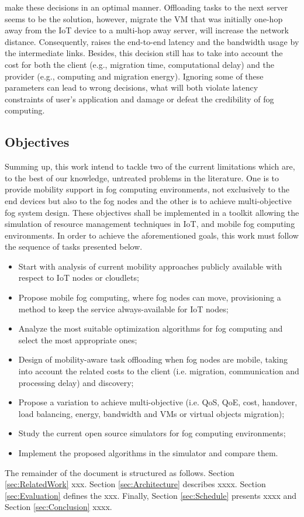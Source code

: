 make these decisions in an optimal manner. Offloading tasks to the next server
seems to be the solution, however, migrate the VM that was initially one-hop
away from the IoT device to a multi-hop away server, will increase the network
distance. Consequently, raises the end-to-end latency and the bandwidth usage by
the intermediate links. Besides, this decision still has to take into account
the cost for both the client (e.g., migration time, computational delay) and the
provider (e.g., computing and migration energy). Ignoring some of these
parameters can lead to wrong decisions, what will both violate latency
constraints of user's application and damage or defeat the credibility of fog
computing.
\subsection{Objectives}\label{subsec:Objectives}
\noindent\tab Summing up, this work intend to tackle two of the current
limitations which are, to the best of our knowledge, untreated problems in the
literature. One is to provide mobility support in fog computing environments,
not exclusively to the end devices but also to the fog nodes and the other is to
achieve multi-objective fog system design. These objectives shall be implemented
in a toolkit allowing the simulation of resource management techniques in IoT,
and mobile fog computing environments. In order to achieve the aforementioned
goals, this work must follow the sequence of tasks presented below.

\begin{itemize}
	\item Start with analysis of current mobility approaches publicly available
	with respect to IoT nodes or cloudlets;
	\item Propose mobile fog computing, where fog nodes can move, provisioning a
	method to keep the service always-available for IoT nodes;
	\item Analyze the most suitable optimization algorithms for fog computing
	and select the most appropriate ones;
	\item Design of mobility-aware task offloading when fog nodes are mobile,
	taking into account the related costs to the client (i.e. migration,
	communication and processing delay) and discovery;
	\item Propose a variation to achieve multi-objective (i.e. QoS, QoE, cost,
	handover, load balancing, energy, bandwidth and VMs or virtual objects
	migration);
	\item Study the current open source simulators for fog computing
	environments;
	\item Implement the proposed algorithms in the simulator and compare them.
\end{itemize}

\noindent\tab The remainder of the document is structured as follows. Section
\ref{sec:RelatedWork} xxx. Section \ref{sec:Architecture} describes xxxx.
Section \ref{sec:Evaluation} defines the xxx. Finally, Section
\ref{sec:Schedule} presents xxxx and Section \ref{sec:Conclusion} xxxx.